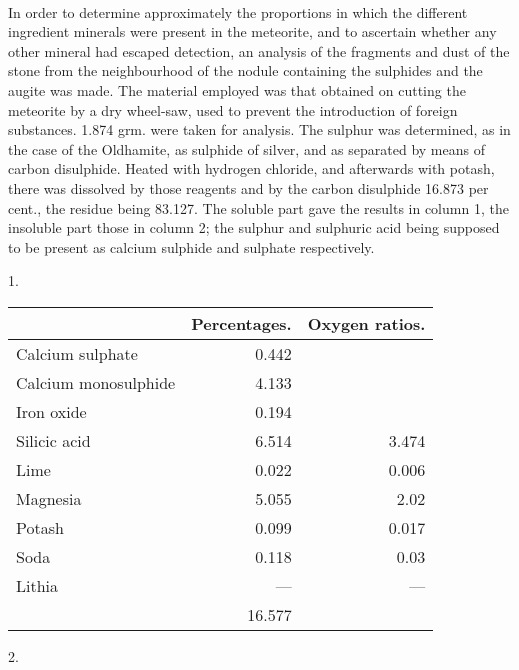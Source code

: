 \documentclass[a4paper, 12pt, oneside]{article}
\begin{document}
\paragraph{}
In order to determine approximately the proportions in which the different ingredient minerals were present in the meteorite, and to ascertain whether any other mineral had escaped detection, an analysis of the fragments and dust of the stone from the neighbourhood of the nodule containing the sulphides and the augite was made. The material employed was that obtained on cutting the meteorite by a dry wheel-saw, used to prevent the introduction of foreign substances. 1.874 grm. were taken for analysis. The sulphur was determined, as in the case of the Oldhamite, as sulphide of silver, and as separated by means of carbon disulphide. Heated with hydrogen chloride, and afterwards with potash, there was dissolved by those reagents and by the carbon disulphide 16.873 per cent., the residue being 83.127. The soluble part gave the results in column 1, the insoluble part those in column 2; the sulphur and sulphuric acid being supposed to be present as calcium sulphide and sulphate respectively.
\begin{center}
1.
\end{center}
\begin{table}[H]
    \centering
    \footnotesize
    \begin{tabular}{l r r}
        ~ & Percentages. & Oxygen ratios. \\ \hline
        Calcium sulphate & 0.442 & ~ \\  
        Calcium monosulphide & 4.133 & ~ \\
        Iron oxide & 0.194 & ~ \\
        Silicic acid & 6.514 & 3.474 \\
        Lime & 0.022 & 0.006 \\
        Magnesia & 5.055 & 2.02 \\
        Potash & 0.099 & 0.017 \\
        Soda & 0.118 & 0.03 \\
        Lithia & --- & --- \\ \hline
        ~ & 16.577 & ~ \\
    \end{tabular}
\end{table}
\begin{center}
2.
\end{center}
\end{document}
